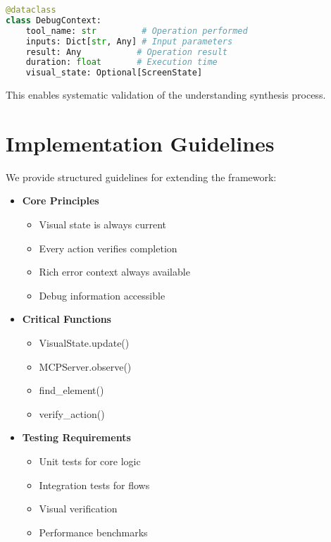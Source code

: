 \documentclass{article}
\begin{document}
\begin{lstlisting}[language=Python]
@dataclass
class DebugContext:
    tool_name: str         # Operation performed
    inputs: Dict[str, Any] # Input parameters
    result: Any           # Operation result
    duration: float       # Execution time
    visual_state: Optional[ScreenState]
\end{lstlisting}

This enables systematic validation of the understanding synthesis process.

\section{Implementation Guidelines}
We provide structured guidelines for extending the framework:

\begin{itemize}
    \item \textbf{Core Principles}
    \begin{itemize}
        \item Visual state is always current
        \item Every action verifies completion
        \item Rich error context always available
        \item Debug information accessible
    \end{itemize}
    
    \item \textbf{Critical Functions}
    \begin{itemize}
        \item VisualState.update()
        \item MCPServer.observe()
        \item find\_element()
        \item verify\_action()
    \end{itemize}
    
    \item \textbf{Testing Requirements}
    \begin{itemize}
        \item Unit tests for core logic
        \item Integration tests for flows
        \item Visual verification
        \item Performance benchmarks
    \end{itemize}
\end{itemize}
\end{document}
